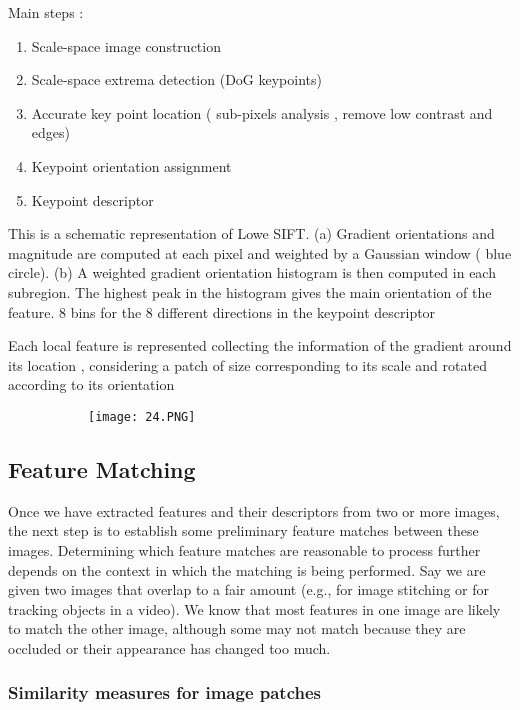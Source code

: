 \documentclass{article}
\begin{document}
Main steps : 

\begin{enumerate}
    \item Scale-space image construction
    \item Scale-space extrema detection (DoG keypoints)
    \item Accurate key point location ( sub-pixels analysis , remove low contrast and edges)
    \item Keypoint orientation assignment
    \item Keypoint descriptor
\end{enumerate}

This is a schematic representation of Lowe SIFT. (a) Gradient orientations and magnitude are computed at each pixel and weighted by a Gaussian window ( blue circle). (b) A weighted gradient orientation histogram is then computed in each subregion. The highest peak in the histogram gives the main orientation of the feature.
8 bins for the 8 different directions in the keypoint descriptor

Each local feature is represented collecting the information of the gradient around its location , considering a patch of size corresponding to its scale and rotated according to its orientation

\begin{figure}[ht!]
  \centering
  \begin{subfigure}[b]{0.7\linewidth}
    \texttt{[image: 24.PNG]}
  \end{subfigure}
\end{figure}

\subsection{Feature Matching}

Once we have extracted features and their descriptors from two or more images, the next
step is to establish some preliminary feature matches between these images.
Determining which feature matches are reasonable to process further depends on the context
in which the matching is being performed. Say we are given two images that overlap to a
fair amount (e.g., for image stitching or for tracking objects in a video). We know that most
features in one image are likely to match the other image, although some may not match
because they are occluded or their appearance has changed too much.

\subsubsection{Similarity measures for image patches}
\end{document}
